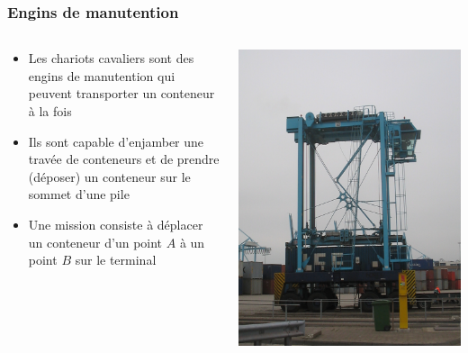 \documentclass{beamer}
\begin{document}
\begin{frame}
 \frametitle{Engins de manutention}
\begin{columns}
  \begin{column}[l]{8cm}
    \begin{itemize}
    \item Les chariots cavaliers sont des engins de manutention qui peuvent transporter un conteneur à la fois
    \item Ils sont capable d'enjamber une travée de conteneurs et de prendre (déposer) un conteneur sur le sommet d'une pile
    \item Une mission consiste à déplacer un conteneur d'un point $A$ à un point $B$ sur le terminal
    \end{itemize}
  \end{column}
  \begin{column}[r]{3cm}
	\begin{flushright}
	    \includegraphics[height=.5\textheight]{fig/Containerlift_straddle_carrier.jpg}
	\end{flushright}
  \end{column}
\end{columns}	
\end{frame}
\end{document}
